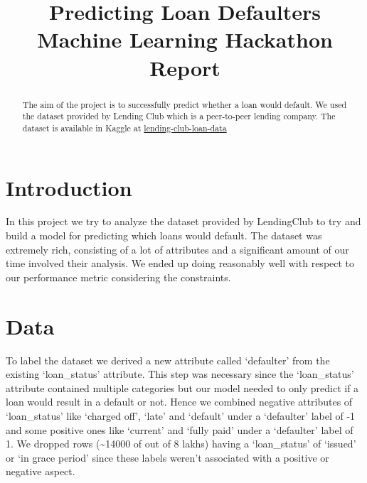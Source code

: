 \documentclass[conference]{IEEEtran}
\begin{document}
\title{Predicting Loan Defaulters\\
{\footnotesize Machine Learning Hackathon Report}
}

\graphicspath{{./images/}}

\author{
\and
{}
\and
{}
}

\maketitle

\begin{abstract}
The aim of the project is to successfully predict whether a loan would
default. We used the dataset provided by Lending Club which is a
peer-to-peer lending company. The dataset is available in Kaggle at
\href{https://www.kaggle.com/wendykan/lending-club-loan-data}{lending-club-loan-data\hspace{0.5em}\faExternalLink}
\end{abstract}

\section{Introduction}
In this project we try to analyze the dataset provided by LendingClub to try
and build a model for predicting which loans would default. The dataset was
extremely rich, consisting of a lot of attributes and a significant amount of
our time involved their analysis. We ended up doing reasonably well with respect
to our performance metric considering the constraints.

\section{Data}
To label the dataset we derived a new attribute called ‘defaulter’ from the
existing ‘loan\_status’ attribute. This step was necessary since the
‘loan\_status’ attribute contained multiple categories but our model needed to
only predict if a loan would result in a default or not. Hence we combined
negative attributes of ‘loan\_status’ like `charged off', `late' and `default'
under a ‘defaulter’ label of -1 and some positive ones like `current' and
`fully paid' under a `defaulter’ label of 1. We dropped rows (\textasciitilde 14000 of out
of 8 lakhs) having a `loan\_status' of `issued' or `in grace period' since
these labels weren't associated with a positive or negative aspect.
\end{document}
